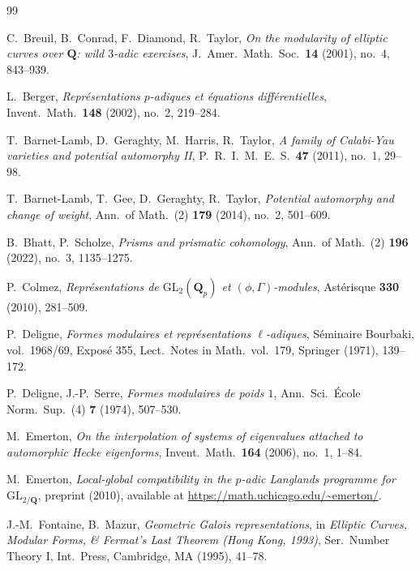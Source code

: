 \documentclass[12pt,a4paper]{amsart}
\theoremstyle{definition}
\theoremstyle{remark}
\begin{document}
\begin{thebibliography}{99}

C.\ Breuil, B.\ Conrad, F.\ Diamond, R.\ Taylor,
\textit{On the modularity of elliptic curves over $\mathbf{Q}$: wild $3$-adic exercises},
J.\ Amer.\ Math.\ Soc.\ \textbf{14} (2001), no.\ 4, 843--939.

L.\ Berger,
\textit{Représentations $p$-adiques et équations différentielles},
Invent.\ Math.\ \textbf{148} (2002), no.\ 2, 219--284.

T.\ Barnet-Lamb, D.\ Geraghty, M.\ Harris, R.\ Taylor,
\textit{A family of Calabi-Yau varieties and potential automorphy II},
P.\ R.\ I.\ M.\ E.\ S.\ \textbf{47} (2011), no.\ 1, 29--98.

T.\ Barnet-Lamb, T.\ Gee, D.\ Geraghty, R.\ Taylor,
\textit{Potential automorphy and change of weight},
Ann.\ of Math.\ (2) \textbf{179} (2014), no.\ 2, 501--609.

B.\ Bhatt, P.\ Scholze,
\textit{Prisms and prismatic cohomology},
Ann.\ of Math.\ (2) \textbf{196} (2022), no.\ 3, 1135--1275.

P.\ Colmez,
\textit{Représentations de $\mathrm{GL}_2(\mathbf{Q}_p)$ et $(\phi, \Gamma)$-modules},
Astérisque \textbf{330} (2010), 281--509.

P.\ Deligne,
\textit{Formes modulaires et représentations $\ell$-adiques},
Séminaire Bourbaki, vol.\ 1968/69, Exposé 355, Lect.\ Notes in Math.\ vol.\ 179,
Springer (1971), 139--172.

P.\ Deligne, J.-P.\ Serre,
\textit{Formes modulaires de poids $1$},
Ann.\ Sci.\ École Norm.\ Sup.\ (4) \textbf{7} (1974), 507--530.

M.\ Emerton,
\textit{On the interpolation of systems of eigenvalues attached to automorphic Hecke eigenforms},
Invent.\ Math.\ \textbf{164} (2006), no.\ 1, 1--84.

M.\ Emerton,
\textit{Local-global compatibility in the $p$-adic Langlands programme for $\mathrm{GL}_{2/\mathbf{Q}}$},
preprint (2010), available at \url{https://math.uchicago.edu/~emerton/}.

J.-M.\ Fontaine, B.\ Mazur,
\textit{Geometric Galois representations},
in \textit{Elliptic Curves, Modular Forms, \& Fermat's Last Theorem (Hong Kong, 1993)},
Ser.\ Number Theory I, Int.\ Press, Cambridge, MA (1995), 41--78.


\end{thebibliography}
\end{document}

